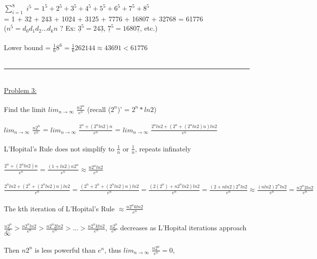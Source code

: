 \documentclass{article}
\begin{document}
    \indent $\sum_{i=1}^8$ $i^5$ = $1^5 + 2^5 + 3^5 + 4^5 + 5^5 + 6^5 + 7^5 + 8^5$\\
    \indent\hspace{1.36cm}= 1 + 32 + 243 + 1024 + 3125 + 7776 + 16807 + 32768 = 61776\\
    \indent\hspace{1.36cm}($n^5 = d_0d_1d_2...d_kn$ ? Ex: $\underline{3}^5 = 24\underline{3}$, $\underline{7}^5 = 1680\underline{7}$, etc.)\\\\
    \indent Lower bound = $\frac{1}{6}8^6 = \frac{1}{6}262144 \approx 43691 < 61776$\\
    \\
    \rule{\textwidth}{0.5pt}\\
    \underline{Problem 3:}\\\\
    Find the limit $lim_{n\rightarrow\infty}$ $\frac{n2^n}{e^n}$ (recall ($2^n$)' = $2^n*ln2$)\\
    \\
    \indent $lim_{n\rightarrow\infty}$ $\frac{n2^n}{e^n}$ = $lim_{n\rightarrow\infty}$ $\frac{2^n + (2^nln2)n}{e^n}$ = $lim_{n\rightarrow\infty}$ $\frac{2^nln2 + (2^n + (2^nln2)n)ln2}{e^n}$\\\\
    \indent L'Hopital's Rule does not simplify to $\frac{1}{n}$ or $\frac{1}{n}$, repeats infinately\\\\
    \indent $\frac{2^n + (2^nln2)n}{e^n} = \frac{(1 + ln2)n2^n}{e^n} \approx \frac{n2^nln2}{e^n}$ \\\\
    \indent $\frac{2^nln2 + (2^n + (2^nln2)n)ln2}{e^n} = \frac{(2^n + 2^n + (2^nln2)n)ln2}{e^n} = \frac{(2(2^n) + n2^nln2)ln2}{e^n} = \frac{(2 + nln2)2^nln2}{e^n} \approx \frac{(nln2)2^nln2}{e^n} = \frac{n2^n2ln2}{e^n}$\\\\
    \indent The kth iteration of L'Hopital's Rule $\approx \frac{n2^nkln2}{e^n}$\\\\
    \indent $\frac{n2^n}{e^n} > \frac{n2^nln2}{e^n} > \frac{n2^n2ln2}{e^n} > ... > \frac{n2^nkln2}{e^n}$, $\frac{n2^n}{e^n}$ decreases as L'Hopital iterations approach $\infty$\\\\
    \indent Then $n2^n$ is less powerful than $e^n$, thus $lim_{n\rightarrow\infty}$ $\frac{n2^n}{e^n} = 0$, 
    \\
\end{document}
